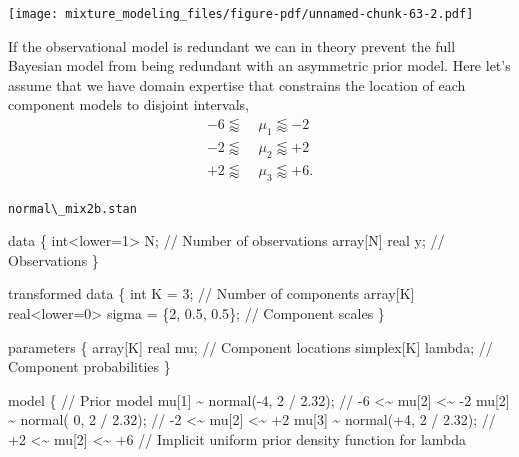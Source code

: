 \documentclass[
  letterpaper,
  DIV=11,
  numbers=noendperiod]{scrartcl}
\newenvironment{Shaded}{\begin{snugshade}}{\end{snugshade}}
\newcommand{\CommentTok}[1]{\textcolor[rgb]{0.37,0.37,0.37}{#1}}
\newcommand{\DataTypeTok}[1]{\textcolor[rgb]{0.68,0.00,0.00}{#1}}
\newcommand{\DecValTok}[1]{\textcolor[rgb]{0.68,0.00,0.00}{#1}}
\newcommand{\FloatTok}[1]{\textcolor[rgb]{0.68,0.00,0.00}{#1}}
\newcommand{\KeywordTok}[1]{\textcolor[rgb]{0.00,0.23,0.31}{#1}}
\newcommand{\NormalTok}[1]{\textcolor[rgb]{0.00,0.23,0.31}{#1}}
\begin{document}
\texttt{[image: mixture\_modeling\_files/figure-pdf/unnamed-chunk-63-2.pdf]}

If the observational model is redundant we can in theory prevent the
full Bayesian model from being redundant with an asymmetric prior model.
Here let's assume that we have domain expertise that constrains the
location of each component models to disjoint intervals, \begin{align*}
-6 \lessapprox & \; \mu_{1} \lessapprox -2
\\
-2 \lessapprox & \; \mu_{2} \lessapprox +2
\\
+2 \lessapprox & \; \mu_{3} \lessapprox +6.
\end{align*}

\begin{codelisting}

\caption{\texttt{normal\textbackslash\_mix2b.stan}}

\begin{Shaded}
\begin{Highlighting}[]
\KeywordTok{data}\NormalTok{ \{}
  \DataTypeTok{int}\NormalTok{\textless{}}\KeywordTok{lower}\NormalTok{=}\DecValTok{1}\NormalTok{\textgreater{} N;  }\CommentTok{// Number of observations}
  \DataTypeTok{array}\NormalTok{[N] }\DataTypeTok{real}\NormalTok{ y; }\CommentTok{// Observations}
\NormalTok{\}}

\KeywordTok{transformed data}\NormalTok{ \{}
  \DataTypeTok{int}\NormalTok{ K = }\DecValTok{3}\NormalTok{;                                    }\CommentTok{// Number of components}
  \DataTypeTok{array}\NormalTok{[K] }\DataTypeTok{real}\NormalTok{\textless{}}\KeywordTok{lower}\NormalTok{=}\DecValTok{0}\NormalTok{\textgreater{} sigma = \{}\DecValTok{2}\NormalTok{, }\FloatTok{0.5}\NormalTok{, }\FloatTok{0.5}\NormalTok{\}; }\CommentTok{// Component scales}
\NormalTok{\}}

\KeywordTok{parameters}\NormalTok{ \{}
  \DataTypeTok{array}\NormalTok{[K] }\DataTypeTok{real}\NormalTok{ mu;  }\CommentTok{// Component locations}
  \DataTypeTok{simplex}\NormalTok{[K] lambda; }\CommentTok{// Component probabilities}
\NormalTok{\}}

\KeywordTok{model}\NormalTok{ \{}
  \CommentTok{// Prior model}
\NormalTok{  mu[}\DecValTok{1}\NormalTok{] \textasciitilde{} normal({-}}\DecValTok{4}\NormalTok{, }\DecValTok{2}\NormalTok{ / }\FloatTok{2.32}\NormalTok{); }\CommentTok{// {-}6 \textless{}\textasciitilde{} mu[2] \textless{}\textasciitilde{} {-}2}
\NormalTok{  mu[}\DecValTok{2}\NormalTok{] \textasciitilde{} normal( }\DecValTok{0}\NormalTok{, }\DecValTok{2}\NormalTok{ / }\FloatTok{2.32}\NormalTok{); }\CommentTok{// {-}2 \textless{}\textasciitilde{} mu[2] \textless{}\textasciitilde{} +2}
\NormalTok{  mu[}\DecValTok{3}\NormalTok{] \textasciitilde{} normal(+}\DecValTok{4}\NormalTok{, }\DecValTok{2}\NormalTok{ / }\FloatTok{2.32}\NormalTok{); }\CommentTok{// +2 \textless{}\textasciitilde{} mu[2] \textless{}\textasciitilde{} +6}
  \CommentTok{// Implicit uniform prior density function for lambda}


\end{Highlighting}
\end{Shaded}
\end{codelisting}
\end{document}
